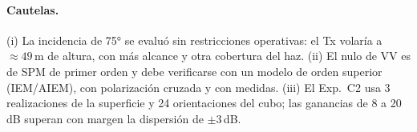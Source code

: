 \paragraph{Cautelas.} (i) La incidencia de 75° se evaluó sin restricciones operativas: el
Tx volaría a $\approx49$\,m de altura, con más alcance y otra cobertura del haz. (ii) El nulo
de VV es de SPM de primer orden y debe verificarse con un modelo de orden superior (IEM/AIEM),
con polarización cruzada y con medidas. (iii) El Exp.~C2 usa 3 realizaciones de la superficie y
24 orientaciones del cubo; las ganancias de 8 a 20\,dB superan con margen la dispersión de
$\pm3$\,dB.
